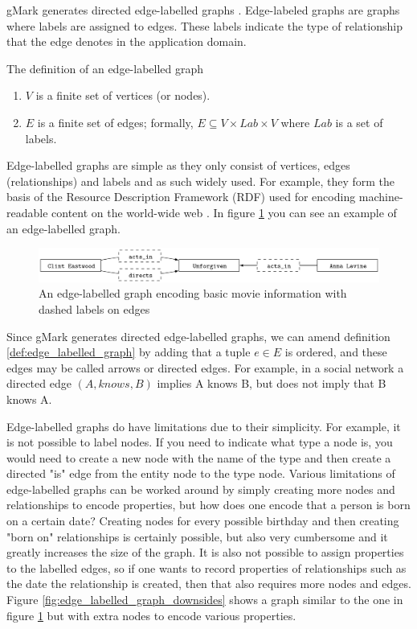 gMark generates directed edge-labelled graphs \cite{Bagan2016GMark:Queries}. Edge-labeled graphs are graphs where labels are assigned to edges. These labels indicate the type of relationship that the edge denotes in the application domain.

\begin{defn}
The definition of an edge-labelled graph \cite{2017ADatabases}
    \begin{enumerate}
      \item $V$ is a finite set of vertices (or nodes).
      \item $E$ is a finite set of edges; formally, $E \subseteq V \times Lab \times V$ where $Lab$ is a set of labels.
    \end{enumerate}
    \label{def:edge_labelled_graph}
\end{defn}

Edge-labelled graphs are simple as they only consist of vertices, edges (relationships) and labels and as such widely used. For example, they form the basis of the Resource Description Framework (RDF) used for encoding machine-readable content on the world-wide web \cite{2017ADatabases}. In figure \ref{fig:edge_labelled_graph} you can see an example of an edge-labelled graph.

\begin{figure}[!ht]
    \includegraphics[width=\textwidth]{figures/edge_labelled_graph.png}
    \caption{An edge-labelled graph encoding basic movie information with dashed labels on edges\cite{2017ADatabases}}
    \label{fig:edge_labelled_graph}
\end{figure}

Since gMark generates directed edge-labelled graphs, we can amend definition \ref{def:edge_labelled_graph} by adding that a tuple $e \in E$ is ordered, and these edges may be called arrows or directed edges. For example, in a social network a directed edge $(A, knows, B)$ implies A knows B, but does not imply that B knows A.

Edge-labelled graphs do have limitations due to their simplicity. For example, it is not possible to label nodes. If you need to indicate what type a node is, you would need to create a new node with the name of the type and then create a directed "is" edge from the entity node to the type node. Various limitations of edge-labelled graphs can be worked around by simply creating more nodes and relationships to encode properties, but how does one encode that a person is born on a certain date? Creating nodes for every possible birthday and then creating "born on" relationships is certainly possible, but also very cumbersome and it greatly increases the size of the graph. It is also not possible to assign properties to the labelled edges, so if one wants to record properties of relationships such as the date the relationship is created, then that also requires more nodes and edges. Figure \ref{fig:edge_labelled_graph_downsides} shows a graph similar to the one in figure \ref{fig:edge_labelled_graph} but with extra nodes to encode various properties.

